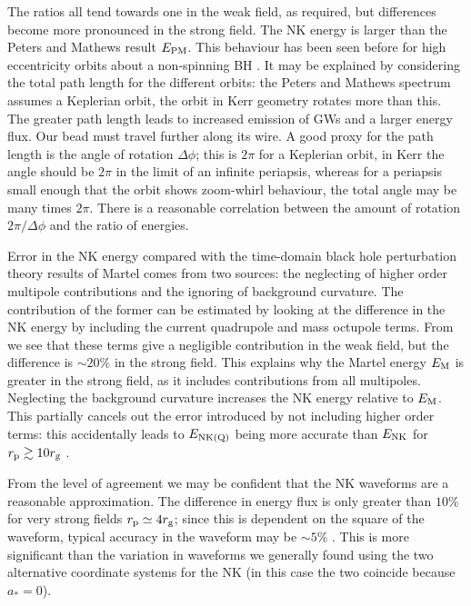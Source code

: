 The ratios all tend towards one in the weak field, as required, but differences become more pronounced in the strong field. The NK energy is larger than the Peters and Mathews result $E_\mathrm{PM}$. This behaviour has been seen before for high eccentricity orbits about a non-spinning BH \citep{Gair2005}. It may be explained by considering the total path length for the different orbits: the Peters and Mathews spectrum assumes a Keplerian orbit, the orbit in Kerr geometry rotates more than this. The greater path length leads to increased emission of GWs and a larger energy flux. Our bead must travel further along its wire. A good proxy for the path length is the angle of rotation $\Delta\phi$; this is $2\pi$ for a Keplerian orbit, in Kerr the angle should be $2\pi$ in the limit of an infinite periapsis, whereas for a periapsis small enough that the orbit shows zoom-whirl behaviour, the total angle may be many times $2\pi$. There is a reasonable correlation between the amount of rotation $2\pi/\Delta\phi$ and the ratio of energies.

Error in the NK energy compared with the time-domain black hole perturbation theory results of Martel comes from two sources: the neglecting of higher order multipole contributions and the ignoring of background curvature. The contribution of the former can be estimated by looking at the difference in the NK energy by including the current quadrupole and mass octupole terms. From  we see that these terms give a negligible contribution in the weak field, but the difference is $\sim20\%$ in the strong field. This explains why the Martel energy $E_\mathrm{M}$ is greater in the strong field, as it includes contributions from all multipoles. Neglecting the background curvature increases the NK energy relative to $E_\mathrm{M}$. This partially cancels out the error introduced by not including higher order terms: this accidentally leads to $E_\mathrm{NK(Q)}$ being more accurate than $E_\mathrm{NK}$ for $r_\mathrm{p} \gtrsim 10 r_\mathrm{g}$ \citep{Tanaka1993}.

From the level of agreement we may be confident that the NK waveforms are a reasonable approximation. The difference in energy flux is only greater than $10\%$ for very strong fields $r_\mathrm{p} \simeq 4 r_\mathrm{g}$; since this is dependent on the square of the waveform, typical accuracy in the waveform may be $\sim 5\%$ \citep{Gair2005,Tanaka1993}. This is more significant than the variation in waveforms we generally found using the two alternative coordinate systems for the NK (in this case the two coincide because $a_\ast = 0$).

